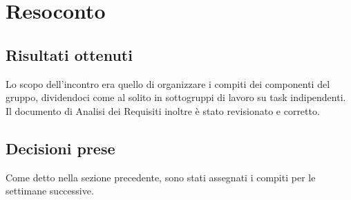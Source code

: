 \section{Resoconto}

\subsection{Risultati ottenuti}
Lo scopo dell'incontro era quello di organizzare i compiti dei componenti del gruppo, dividendoci come al solito in sottogruppi di lavoro su task indipendenti. Il documento di Analisi dei Requisiti inoltre è stato revisionato e corretto.

\subsection{Decisioni prese}
Come detto nella sezione precedente, sono stati assegnati i compiti per le settimane successive.